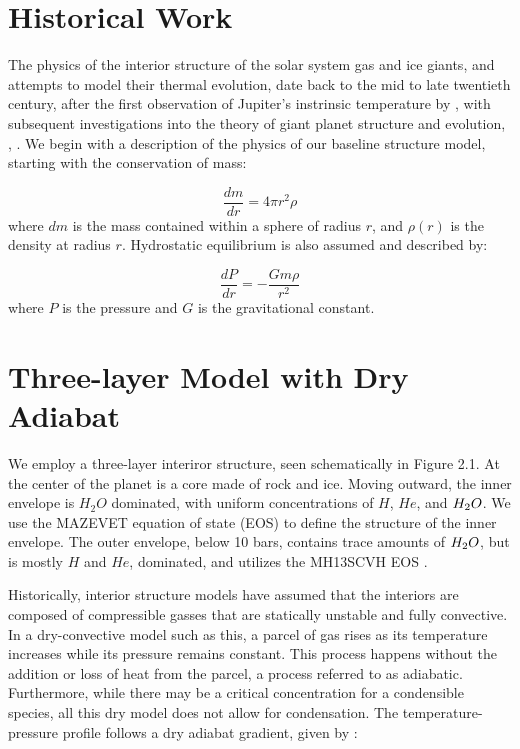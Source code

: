 \documentclass[11pt]{ucscthesisbs}
\begin{document}
\section{Historical Work}
The physics of the interior structure of the solar system gas and ice giants, and attempts to model their thermal evolution, date back to the mid to late twentieth century, after the first observation of Jupiter's instrinsic temperature by \cite{low_1966}, with subsequent investigations into the theory of giant planet structure and evolution\citep{hubbard_1977}, \citep{hubbard_1977_2}, \citep{podolak_1991}. We begin with a description of the physics of our baseline structure model, starting with the conservation of mass:

\begin{equation}
  \frac{dm}{dr} =4 \pi r^{2}\rho  
\end{equation}
where $dm$ is the mass contained within a sphere of radius $r$, and $\rho(r)$ is the density at radius $r$. Hydrostatic equilibrium is also assumed and described by:

\begin{equation}
  \frac{dP}{dr} = -\frac{Gm\rho}{r^{2}}  
\end{equation}
where $P$ is the pressure and $G$ is the gravitational constant. 


\section{Three-layer Model with Dry Adiabat}
We employ a three-layer interiror structure, seen schematically in Figure 2.1. At the center of the planet is a core made of rock and ice. Moving outward, the inner envelope is $H_{2}O$ dominated, with uniform concentrations of $H$, $He$, and $H_{\rm{2}}O$. We use the MAZEVET equation of state (EOS) \citep{mazevet_2019} to define the structure of the inner envelope. The outer envelope, below 10 bars, contains trace amounts of $H_{\rm{2}}O$, but is mostly $H$ and $He$, dominated, and utilizes the MH13SCVH EOS \citep{miguel_2018}. 

Historically, interior structure models have assumed that the interiors are composed of compressible gasses that are statically unstable and fully convective. In a dry-convective model such as this, a parcel of gas rises as its temperature increases while its pressure remains constant. This process happens without the addition or loss of heat from the parcel, a process referred to as adiabatic. Furthermore, while there may be a critical concentration for a condensible species, all this dry model does not allow for condensation. The temperature-pressure profile follows a dry adiabat gradient\citep{kippenhahn_2012}, given by :
\end{document}
